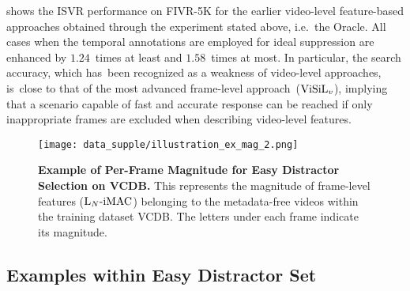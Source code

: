 \documentclass[10pt,twocolumn,letterpaper]{article}
\begin{document}
         shows the ISVR performance on FIVR-5K for the earlier video-level feature-based approaches obtained through the experiment stated above, i.e.~the Oracle. All cases when the temporal annotations are employed for ideal suppression are enhanced by $1.24$~times at least and $1.58$~times at most. In particular, the search accuracy, which has~been recognized as a weakness of video-level approaches, is~close to that of the most advanced frame-level approach~($\textup{ViSiL}_{v}$), implying that a scenario capable of fast and accurate response can be reached if only inappropriate frames are excluded when describing video-level features.


        

    \begin{figure*}[!ht]    
        \centering
        \texttt{[image: data\_supple/illustration\_ex\_mag\_2.png]} \vspace{-0mm}
        \caption{\textbf{Example of Per-Frame Magnitude for Easy Distractor Selection on VCDB.} This represents the magnitude of frame-level features ($\textup{L}_{N}\textup{-iMAC}$) belonging to the metadata-free videos within the training dataset VCDB. The letters under each frame indicate its magnitude.\vspace{-0mm}} \label{fig:ex_mag}
    \end{figure*}
    
    
    \subsection{Examples within Easy Distractor Set} \label{ddm_exam}
\end{document}
